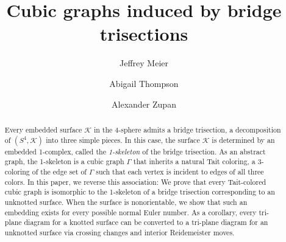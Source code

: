 \documentclass[11pt, oneside]{amsart}
\theoremstyle{theorem}
\theoremstyle{definition}
\theoremstyle{theorem}
\begin{document}
\rhead{\thepage}
\lhead{\author}
\thispagestyle{empty}


\raggedbottom
{}
\setcounter{section}{0}


\title{Cubic graphs induced by bridge trisections}

\author{Jeffrey Meier}
\address{Department of Mathematics \\ Western Washington University, Bellingham, WA 98225}

\author{Abigail Thompson}
\address{Department of Mathematics \\ University of California, Davis, Davis, CA 95616}

\author{Alexander Zupan}
\address{Department of Mathematics, University of Nebraska-Lincoln, Lincoln, NE 68588}

\begin{abstract}
	Every embedded surface $\mathcal{K}$ in the 4-sphere admits a bridge trisection, a decomposition of $(S^4,\mathcal{K})$ into three simple pieces.  In this case, the surface $\mathcal{K}$ is determined by an embedded 1-complex, called the \emph{1-skeleton} of the bridge trisection.  As an abstract graph, the 1-skeleton is a cubic graph $\Gamma$ that inherits a natural Tait coloring, a 3-coloring of the edge set of $\Gamma$ such that each vertex is incident to edges of all three colors.  In this paper, we reverse this association:  We prove that every Tait-colored cubic graph is isomorphic to the 1-skeleton of a bridge trisection corresponding to an unknotted surface.  When the surface is nonorientable, we show that such an embedding exists for every possible normal Euler number.  As a corollary, every tri-plane diagram for a knotted surface can be converted to a tri-plane diagram for an unknotted surface via crossing changes and interior Reidemeister moves.
\end{abstract}

\maketitle
\end{document}
